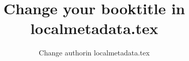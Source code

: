 \author{Change author\lastand in localmetadata.tex} %
\title{Change your booktitle in localmetadata.tex}  

\renewcommand{\lsSeries}{dummyseries} %
\renewcommand{\lsSeriesNumber}{99} %



\renewcommand{\lsISBNdigital}{000-0-000000-00-0}
\renewcommand{\lsISBNhardcover}{000-0-000000-00-0} 
